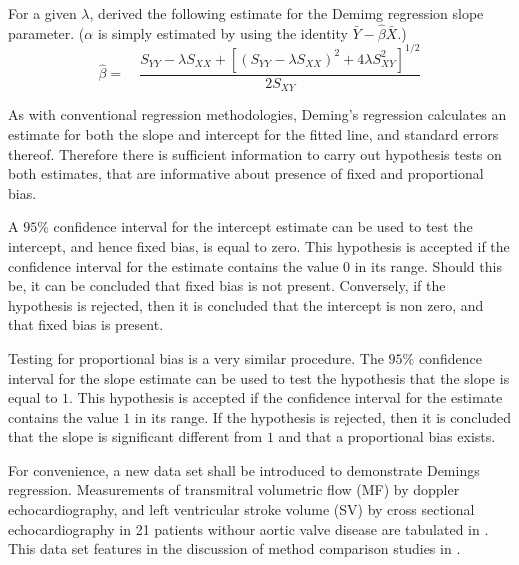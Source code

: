 \documentclass[MAIN.tex]{subfiles}
\begin{document}
	For a given $\lambda$, \citet{Kummel} derived the following
	estimate for the Demimg regression slope parameter. ($\alpha$ is
	simply estimated by using the identity
	$\bar{Y}-\hat{\beta}\bar{X}$.)
	\begin{equation}
	\hat{\beta} =\quad \frac{S_{YY} - \lambda S_{XX}+[(S_{YY} -
		\lambda S_{XX})^{2}+ 4\lambda S^{2}_{XY}]^{1/2}}{2S_{XY}}
	\end{equation}
	
	
	As with conventional regression methodologies, Deming's regression
	calculates an estimate for both the slope and intercept for the
	fitted line, and standard errors thereof. Therefore there is
	sufficient information to carry out hypothesis tests on both
	estimates, that are informative about presence of fixed and
	proportional bias.
	
	A $95\%$ confidence interval for the intercept estimate can be
	used to test the intercept, and hence fixed bias, is equal to
	zero. This hypothesis is accepted if the confidence interval for
	the estimate contains the value $0$ in its range. Should this be,
	it can be concluded that fixed bias is not present. Conversely, if
	the hypothesis is rejected, then it is concluded that the
	intercept is non zero, and that fixed bias is present.
	
	Testing for proportional bias is a very similar procedure. The
	$95\%$ confidence interval for the slope estimate can be used to
	test the hypothesis that the slope is equal to $1$. This
	hypothesis is accepted if the confidence interval for the estimate
	contains the value $1$ in its range. If the hypothesis is
	rejected, then it is concluded that the slope is significant
	different from $1$ and that a proportional bias exists.
	
	For convenience, a new data set shall be introduced to demonstrate
	Demings regression. Measurements of transmitral volumetric flow
	(MF) by doppler echocardiography, and left ventricular stroke
	volume (SV) by cross sectional echocardiography in 21 patients
	withour aortic valve disease are tabulated in \citet{zhang}. This
	data set features in the discussion of method comparison studies
	in \citet[p.398]{images/AltmanBook} .
	
\end{document}
